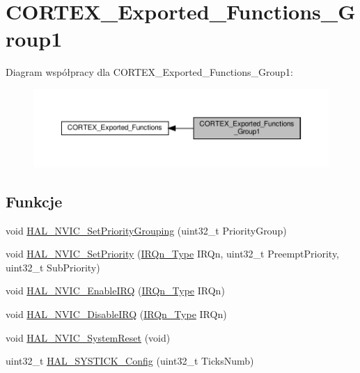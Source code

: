 \hypertarget{group___c_o_r_t_e_x___exported___functions___group1}{}\section{C\+O\+R\+T\+E\+X\+\_\+\+Exported\+\_\+\+Functions\+\_\+\+Group1}
\label{group___c_o_r_t_e_x___exported___functions___group1}
Diagram współpracy dla C\+O\+R\+T\+E\+X\+\_\+\+Exported\+\_\+\+Functions\+\_\+\+Group1\+:\nopagebreak
\begin{figure}[H]
\begin{center}
\leavevmode
\includegraphics[width=350pt]{group___c_o_r_t_e_x___exported___functions___group1}
\end{center}
\end{figure}
\subsection*{Funkcje}
\begin{DoxyCompactItemize}
\item 
void \hyperlink{group___c_o_r_t_e_x___exported___functions___group1_gad9be53e08b1498adea006e5e037f238f}{H\+A\+L\+\_\+\+N\+V\+I\+C\+\_\+\+Set\+Priority\+Grouping} (uint32\+\_\+t Priority\+Group)
\item 
void \hyperlink{group___c_o_r_t_e_x___exported___functions___group1_ga8581a82025a4780efd00876a66e3e91b}{H\+A\+L\+\_\+\+N\+V\+I\+C\+\_\+\+Set\+Priority} (\hyperlink{group___peripheral__interrupt__number__definition_ga7e1129cd8a196f4284d41db3e82ad5c8}{I\+R\+Qn\+\_\+\+Type} I\+R\+Qn, uint32\+\_\+t Preempt\+Priority, uint32\+\_\+t Sub\+Priority)
\item 
void \hyperlink{group___c_o_r_t_e_x___exported___functions___group1_gaaad4492c1b25e006d69948a15790352a}{H\+A\+L\+\_\+\+N\+V\+I\+C\+\_\+\+Enable\+I\+RQ} (\hyperlink{group___peripheral__interrupt__number__definition_ga7e1129cd8a196f4284d41db3e82ad5c8}{I\+R\+Qn\+\_\+\+Type} I\+R\+Qn)
\item 
void \hyperlink{group___c_o_r_t_e_x___exported___functions___group1_ga50ca6290e068821cb84aa168f3e13967}{H\+A\+L\+\_\+\+N\+V\+I\+C\+\_\+\+Disable\+I\+RQ} (\hyperlink{group___peripheral__interrupt__number__definition_ga7e1129cd8a196f4284d41db3e82ad5c8}{I\+R\+Qn\+\_\+\+Type} I\+R\+Qn)
\item 
void \hyperlink{group___c_o_r_t_e_x___exported___functions___group1_gac83d89028fabdf5d4c38ecf4fbfbefdc}{H\+A\+L\+\_\+\+N\+V\+I\+C\+\_\+\+System\+Reset} (void)
\item 
uint32\+\_\+t \hyperlink{group___c_o_r_t_e_x___exported___functions___group1_gac3a3f0d53c315523a8e6e7bcac1940cf}{H\+A\+L\+\_\+\+S\+Y\+S\+T\+I\+C\+K\+\_\+\+Config} (uint32\+\_\+t Ticks\+Numb)
\end{DoxyCompactItemize}


